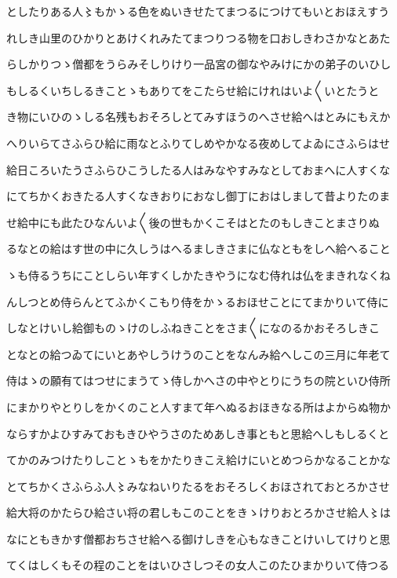 \documentclass[a4paper,11pt,landscape]{ltjtarticle}
\begin{document}
としたりある人〻もかゝる色をぬいきせたてまつるにつけてもいとおほえすう
\par\medskip
れしき山里のひかりとあけくれみたてまつりつる物を口おしきわさかなとあた
\par\medskip
らしかりつゝ僧都をうらみそしりけり一品宮の御なやみけにかの弟子のいひし
\par\medskip
もしるくいちしるきことゝもありてをこたらせ給にけれはいよ〱いとたうと
\par\medskip
き物にいひのゝしる名残もおそろしとてみすほうのへさせ給へはとみにもえか
\par\medskip
へりいらてさふらひ給に雨なとふりてしめやかなる夜めしてよゐにさふらはせ
\par\medskip
給日ころいたうさふらひこうしたる人はみなやすみなとしておまへに人すくな
\par\medskip
にてちかくおきたる人すくなきおりにおなし御丁におはしまして昔よりたのま
\par\medskip
せ給中にも此たひなんいよ〱後の世もかくこそはとたのもしきことまさりぬ
\par\medskip
るなとの給はす世の中に久しうはへるましきさまに仏なともをしへ給へること
\par\medskip
ゝも侍るうちにことしらい年すくしかたきやうになむ侍れは仏をまきれなくね
\par\medskip
んしつとめ侍らんとてふかくこもり侍をかゝるおほせことにてまかりいて侍に
\par\medskip
しなとけいし給御ものゝけのしふねきことをさま〱になのるかおそろしきこ
\par\medskip
となとの給つゐてにいとあやしうけうのことをなんみ給へしこの三月に年老て
\par\medskip
侍はゝの願有てはつせにまうてゝ侍しかへさの中やとりにうちの院といひ侍所
\par\medskip
にまかりやとりしをかくのこと人すまて年へぬるおほきなる所はよからぬ物か
\par\medskip
ならすかよひすみておもきひやうさのためあしき事ともと思給へしもしるくと
\par\medskip
てかのみつけたりしことゝもをかたりきこえ給けにいとめつらかなることかな
\par\medskip
とてちかくさふらふ人〻みなねいりたるをおそろしくおほされておとろかさせ
\par\medskip
給大将のかたらひ給さい将の君しもこのことをきゝけりおとろかさせ給人〻は
\par\medskip
なにともきかす僧都おちさせ給へる御けしきを心もなきことけいしてけりと思
\par\medskip
てくはしくもその程のことをはいひさしつその女人このたひまかりいて侍つる
\end{document}
